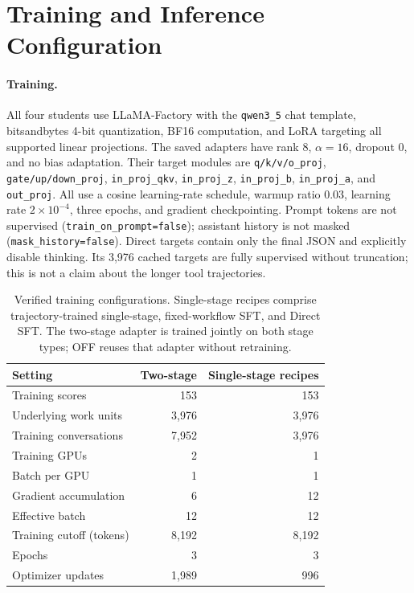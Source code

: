 \clearpage
\appendix
\section{Training and Inference Configuration}
\label{sec:reproducibility}

\paragraph{Training.}
All four students use LLaMA-Factory with the \texttt{qwen3\_5} chat template, bitsandbytes 4-bit quantization, BF16 computation, and LoRA targeting all supported linear projections. The saved adapters have rank 8, $\alpha=16$, dropout 0, and no bias adaptation. Their target modules are \texttt{q/k/v/o\_proj}, \texttt{gate/up/down\_proj}, \texttt{in\_proj\_qkv}, \texttt{in\_proj\_z}, \texttt{in\_proj\_b}, \texttt{in\_proj\_a}, and \texttt{out\_proj}. All use a cosine learning-rate schedule, warmup ratio 0.03, learning rate $2\times10^{-4}$, three epochs, and gradient checkpointing. Prompt tokens are not supervised (\texttt{train\_on\_prompt=false}); assistant history is not masked (\texttt{mask\_history=false}). Direct targets contain only the final JSON and explicitly disable thinking. Its 3,976 cached targets are fully supervised without truncation; this is not a claim about the longer tool trajectories.

\begin{table}[htbp]
\centering\footnotesize
\setlength{\tabcolsep}{3pt}
\begin{tabularx}{\linewidth}{@{}Xrr@{}}
\toprule
Setting & Two-stage & Single-stage recipes \\
\midrule
Training scores & 153 & 153 \\
Underlying work units & 3,976 & 3,976 \\
Training conversations & 7,952 & 3,976 \\
Training GPUs & 2 & 1 \\
Batch per GPU & 1 & 1 \\
Gradient accumulation & 6 & 12 \\
Effective batch & 12 & 12 \\
Training cutoff (tokens) & 8,192 & 8,192 \\
Epochs & 3 & 3 \\
Optimizer updates & 1,989 & 996 \\
\bottomrule
\end{tabularx}
\caption{Verified training configurations. Single-stage recipes comprise trajectory-trained single-stage, fixed-workflow SFT, and Direct SFT. The two-stage adapter is trained jointly on both stage types; OFF reuses that adapter without retraining.}
\label{tab:training-config}
\end{table}

